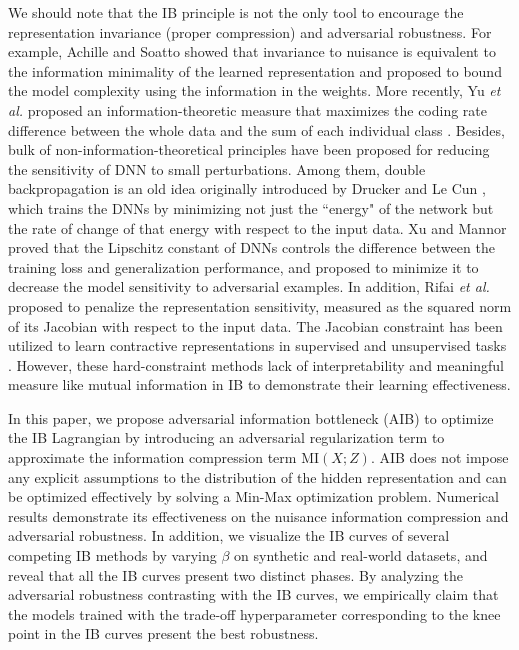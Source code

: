 \documentclass[10pt,journal,compsoc]{IEEEtran}
\begin{document}
We should note that the IB principle is not the only tool to encourage the representation invariance (proper compression) and adversarial robustness. For example, Achille and Soatto \cite{Achille2018EmergenceOI} showed that invariance to nuisance is equivalent to the information minimality of the learned representation and proposed to bound the model complexity using the information in the weights. More recently, Yu \emph{et al.} proposed an information-theoretic measure that maximizes the coding rate difference between the whole data and the sum of each individual class \cite{Yu2020LearningDA}.
Besides, bulk of non-information-theoretical principles have been proposed for reducing the sensitivity of DNN to small perturbations. Among them, double backpropagation is an old idea originally introduced by Drucker and Le Cun \cite{165600}, which trains the DNNs by minimizing not just the ``energy" of the network but the rate of change of that energy with respect to the input data. Xu and Mannor \cite{Xu2011RobustnessAG} proved that the Lipschitz constant of DNNs controls the difference between the training loss and generalization performance, and proposed to minimize it to decrease the model sensitivity to adversarial examples. In addition, Rifai \emph{et al.} \cite{Rifai2011ContractiveAE} proposed to penalize the representation sensitivity, measured as the squared norm of its Jacobian with respect to the input data. The Jacobian constraint has been utilized to learn contractive representations in supervised and unsupervised tasks \cite{Rifai2011ContractiveAE,Gu2015TowardsDN}. However, these hard-constraint methods lack of interpretability and meaningful measure like mutual information in IB to demonstrate their learning effectiveness.


In this paper, we propose adversarial information bottleneck (AIB) to optimize the IB Lagrangian by introducing an adversarial regularization term to approximate the information compression term $\mathrm{MI}(X; Z)$. AIB does not impose any explicit assumptions to the distribution of the hidden representation and can be optimized effectively by solving a Min-Max optimization problem. Numerical results demonstrate its effectiveness on the nuisance information compression and adversarial robustness.
In addition, we visualize the IB curves of several competing IB methods by varying $\beta$ on synthetic and real-world datasets, and reveal that all the IB curves present two distinct phases. By analyzing the adversarial robustness contrasting with the IB curves, we empirically claim that the models trained with the trade-off hyperparameter corresponding to the knee point in the IB curves present the best robustness.
\end{document}
